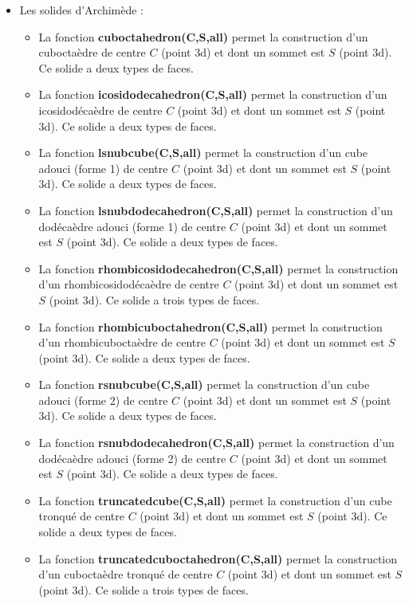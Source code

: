 \begin{itemize}
    \item Les solides d'Archimède :
        \begin{itemize}
            \item La fonction \textbf{cuboctahedron(C,S,all)} permet la construction d'un cuboctaèdre de centre $C$ (point 3d) et dont un sommet est $S$ (point 3d). Ce solide a deux types de faces.
            \item La fonction \textbf{icosidodecahedron(C,S,all)} permet la construction d'un icosidodécaèdre de centre $C$ (point 3d) et dont un sommet est $S$ (point 3d). Ce solide a deux types de faces.
            \item La fonction \textbf{lsnubcube(C,S,all)} permet la construction d'un cube adouci (forme 1) de centre $C$ (point 3d) et dont un sommet est $S$ (point 3d). Ce solide a deux types de faces.
            \item La fonction \textbf{lsnubdodecahedron(C,S,all)} permet la construction d'un dodécaèdre adouci (forme 1) de centre $C$ (point 3d) et dont un sommet est $S$ (point 3d). Ce solide a deux types de faces.
            \item La fonction \textbf{rhombicosidodecahedron(C,S,all)} permet la construction d'un rhombicosidodécaèdre de centre $C$ (point 3d) et dont un sommet est $S$ (point 3d). Ce solide a trois types de faces.
            \item La fonction \textbf{rhombicuboctahedron(C,S,all)} permet la construction d'un rhombicuboctaèdre de centre $C$ (point 3d) et dont un sommet est $S$ (point 3d). Ce solide a deux types de faces.
            \item La fonction \textbf{rsnubcube(C,S,all)} permet la construction d'un cube adouci (forme 2) de centre $C$ (point 3d) et dont un sommet est $S$ (point 3d). Ce solide a deux types de faces.
            \item La fonction \textbf{rsnubdodecahedron(C,S,all)} permet la construction d'un dodécaèdre adouci (forme 2) de centre $C$ (point 3d) et dont un sommet est $S$ (point 3d). Ce solide a deux types de faces.
            \item La fonction \textbf{truncatedcube(C,S,all)} permet la construction d'un cube tronqué de centre $C$ (point 3d) et dont un sommet est $S$ (point 3d). Ce solide a deux types de faces.
            \item La fonction \textbf{truncatedcuboctahedron(C,S,all)} permet la construction d'un cuboctaèdre tronqué de centre $C$ (point 3d) et dont un sommet est $S$ (point 3d). Ce solide a trois types de faces.

\end{itemize}
\end{itemize}
